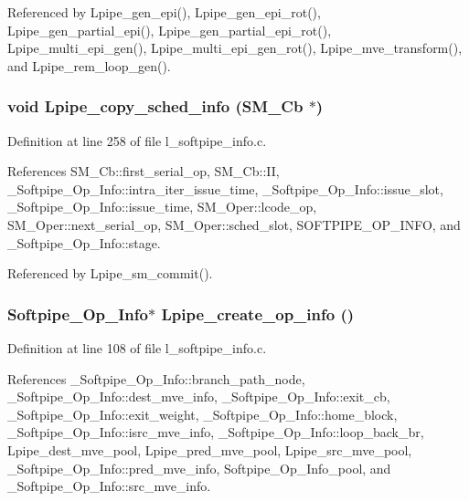 Referenced by Lpipe\_\-gen\_\-epi(), Lpipe\_\-gen\_\-epi\_\-rot(), Lpipe\_\-gen\_\-partial\_\-epi(), Lpipe\_\-gen\_\-partial\_\-epi\_\-rot(), Lpipe\_\-multi\_\-epi\_\-gen(), Lpipe\_\-multi\_\-epi\_\-gen\_\-rot(), Lpipe\_\-mve\_\-transform(), and Lpipe\_\-rem\_\-loop\_\-gen().
\subsubsection{\setlength{\rightskip}{0pt plus 5cm}void Lpipe\_\-copy\_\-sched\_\-info (\bf{SM\_\-Cb} $\ast$)}\label{l__softpipe__info_8h_8723da582e7e68a47c39627ccb944379}




Definition at line 258 of file l\_\-softpipe\_\-info.c.

References SM\_\-Cb::first\_\-serial\_\-op, SM\_\-Cb::II, \_\-Softpipe\_\-Op\_\-Info::intra\_\-iter\_\-issue\_\-time, \_\-Softpipe\_\-Op\_\-Info::issue\_\-slot, \_\-Softpipe\_\-Op\_\-Info::issue\_\-time, SM\_\-Oper::lcode\_\-op, SM\_\-Oper::next\_\-serial\_\-op, SM\_\-Oper::sched\_\-slot, SOFTPIPE\_\-OP\_\-INFO, and \_\-Softpipe\_\-Op\_\-Info::stage.

Referenced by Lpipe\_\-sm\_\-commit().
\subsubsection{\setlength{\rightskip}{0pt plus 5cm}\bf{Softpipe\_\-Op\_\-Info}$\ast$ Lpipe\_\-create\_\-op\_\-info ()}\label{l__softpipe__info_8h_20e0bb7258cae1e6da705eff2689ea9c}




Definition at line 108 of file l\_\-softpipe\_\-info.c.

References \_\-Softpipe\_\-Op\_\-Info::branch\_\-path\_\-node, \_\-Softpipe\_\-Op\_\-Info::dest\_\-mve\_\-info, \_\-Softpipe\_\-Op\_\-Info::exit\_\-cb, \_\-Softpipe\_\-Op\_\-Info::exit\_\-weight, \_\-Softpipe\_\-Op\_\-Info::home\_\-block, \_\-Softpipe\_\-Op\_\-Info::isrc\_\-mve\_\-info, \_\-Softpipe\_\-Op\_\-Info::loop\_\-back\_\-br, Lpipe\_\-dest\_\-mve\_\-pool, Lpipe\_\-pred\_\-mve\_\-pool, Lpipe\_\-src\_\-mve\_\-pool, \_\-Softpipe\_\-Op\_\-Info::pred\_\-mve\_\-info, Softpipe\_\-Op\_\-Info\_\-pool, and \_\-Softpipe\_\-Op\_\-Info::src\_\-mve\_\-info.

